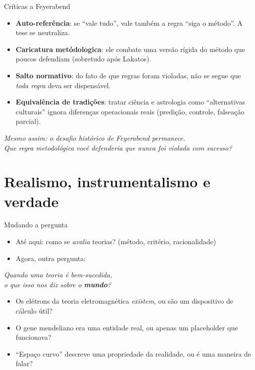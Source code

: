 \documentclass[aspectratio=169]{beamer}
\newcommand{\impt}[1]{\textcolor{maccent}{\textbf{#1}}}
\newcommand{\ntc}[1]{\textcolor{mprimary}{#1}}
\begin{document}
\begin{frame}{Cr\'iticas a Feyerabend}
\begin{itemize}
    \item \impt{Auto-refer\^encia}: se ``vale tudo'', vale tamb\'em a regra ``siga o m\'etodo''. A tese se neutraliza.
    \item \impt{Caricatura met\'odologica}: ele combate uma vers\~ao r\'igida do m\'etodo que poucos defendiam (sobretudo ap\'os Lakatos).
    \item \impt{Salto normativo}: do fato de que regras foram violadas, n\~ao se segue que \emph{toda regra} deva ser dispens\'avel.
    \item \impt{Equival\^encia de tradi\c c\~oes}: tratar ci\^encia e astrologia como ``alternativas culturais'' ignora diferen\c cas \ntc{operacionais} reais (predi\c c\~ao, controle, falsea\c c\~ao parcial).
\end{itemize}
\vspace{0.3cm}
\begin{center}
\itshape Mesmo assim: o desafio hist\'orico de Feyerabend permanece. \\
Que regra metodol\'ogica voc\^e defenderia que \emph{nunca} foi violada com sucesso?
\end{center}
\end{frame}

\section{Realismo, instrumentalismo e verdade}

\begin{frame}{Mudando a pergunta}
\begin{itemize}
    \item At\'e aqui: como se \emph{avalia} teorias? (m\'etodo, crit\'erio, racionalidade)
    \item Agora, outra pergunta:
\end{itemize}
\vspace{0.4cm}
\begin{center}
\large\itshape Quando uma teoria \'e bem-sucedida, \\
o que isso nos diz sobre o \impt{mundo}?
\end{center}
\vspace{0.4cm}
\begin{itemize}
    \item Os el\'etrons da teoria eletromagn\'etica \emph{existem}, ou s\~ao um \ntc{dispositivo de c\'alculo} \'util?
    \item O gene mendeliano era uma entidade real, ou apenas um placeholder que funcionava?
    \item ``Espa\c co curvo'' descreve uma propriedade da realidade, ou \'e uma \ntc{maneira de falar}?
\end{itemize}
\end{frame}
\end{document}
